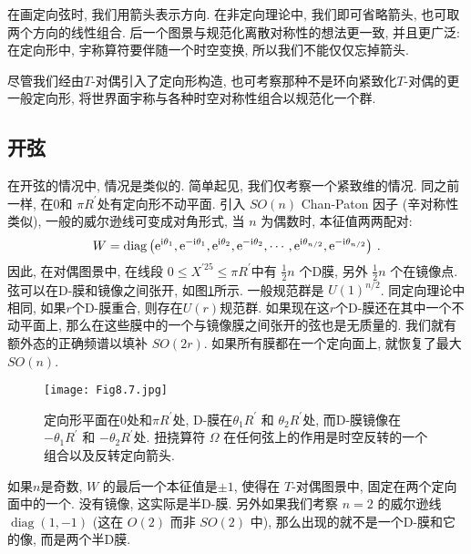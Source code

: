 在画定向弦时, 我们用箭头表示方向. 在非定向理论中, 我们即可省略箭头, 也可取两个方向的线性组合. 
后一个图景与规范化离散对称性的想法更一致, 并且更广泛: 在定向形中, 宇称算符要伴随一个时空变换, 所以我们不能仅仅忘掉箭头.

尽管我们经由$T$-对偶引入了定向形构造, 也可考察那种不是环向紧致化$T$-对偶的更一般定向形, 将世界面宇称与各种时空对称性组合以规范化一个群.

\subsection*{开弦}

在开弦的情况中, 情况是类似的. 简单起见, 我们仅考察一个紧致维的情况. 同之前一样, 在0和 $\pi R^{\prime}$处有定向形不动平面. 
引入 $SO(n)$ Chan-Paton 因子 (辛对称性类似), 一般的威尔逊线可变成对角形式, 当 $n$ 为偶数时, 本征值两两配对: 
\begin{equation}
	W = \operatorname{diag}\left(\mathrm{e}^{\mathrm{i} \theta_{1}}, \mathrm{e}^{-\mathrm{i} \theta_{1}}, \mathrm{e}^{\mathrm{i} \theta_{2}}, \mathrm{e}^{-\mathrm{i} \theta_{2}}, \cdots, 
								 \mathrm{e}^{\mathrm{i} \theta_{n/2}}, \mathrm{e}^{-\mathrm{i} \theta_{n/2}}\right) \:. \label{8.8.4}
\end{equation}
因此, 在对偶图景中, 在线段 $0 \leq X^{\prime 25} \leq \pi R^{\prime}$中有 $\frac{1}{2} n$ 个D膜, 另外 $\frac{1}{2} n$ 个在镜像点. 
弦可以在D-膜和镜像之间张开, 如图\ref{Fig8.7}所示. 一般规范群是 $U(1)^{n/2}$. 同定向理论中相同, 如果$r$个D-膜重合, 则存在$U(r)$规范群. 
如果现在这$r$个D-膜还在其中一个不动平面上, 那么在这些膜中的一个与镜像膜之间张开的弦也是无质量的. 我们就有额外态的正确频谱以填补 $SO(2r)$. 
如果所有膜都在一个定向面上, 就恢复了最大 $SO(n)$.

\begin{figure}
	\begin{center}
		\texttt{[image: Fig8.7.jpg]}
		\caption{定向形平面在0处和$\pi R^{\prime}$处, D-膜在$\theta_{1} R^{\prime}$ 和 $\theta_{2} R^{\prime}$处, 
		而D-膜镜像在$-\theta_{1} R^{\prime}$ 和 $-\theta_{2} R^{\prime}$处. 扭挠算符 $\Omega$ 在任何弦上的作用是时空反转的一个组合以及反转定向箭头. 
		}\label{Fig8.7}
	\end{center}
\end{figure}


如果$n$是奇数, $W$ 的最后一个本征值是$\pm 1$, 使得在 $T$-对偶图景中, 固定在两个定向面中的一个. 没有镜像, 这实际是半D-膜. 
另外如果我们考察 $n=2$ 的威尔逊线 $\operatorname{diag}(1,-1)$ (这在 $O(2)$ 而非 $SO(2)$ 中), 那么出现的就不是一个D-膜和它的像, 而是两个半D膜.

